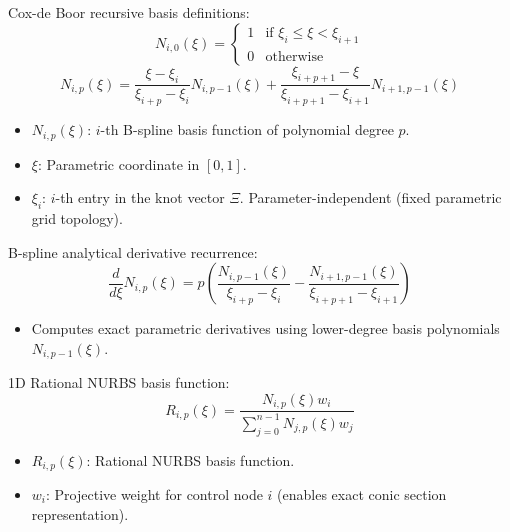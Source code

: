 \documentclass[12pt,a4paper,oneside]{report}
\begin{document}
Cox-de Boor recursive basis definitions:
\begin{equation}
    N_{i,0}(\xi) = \begin{cases} 1 & \text{if } \xi_i \le \xi < \xi_{i+1} \\ 0 & \text{otherwise} \end{cases}
\end{equation}
\begin{equation}
    N_{i,p}(\xi) = \frac{\xi - \xi_i}{\xi_{i+p} - \xi_i} N_{i,p-1}(\xi) + \frac{\xi_{i+p+1} - \xi}{\xi_{i+p+1} - \xi_{i+1}} N_{i+1,p-1}(\xi)
\end{equation}
\begin{tcolorbox}[colback=gray!5!white,colframe=gray!60!black,title={Term Definitions \& Parameter Dependencies}]
\begin{itemize}
    \item $N_{i,p}(\xi)$: $i$-th B-spline basis function of polynomial degree $p$.
    \item $\xi$: Parametric coordinate in $[0, 1]$.
    \item $\xi_i$: $i$-th entry in the knot vector $\Xi$. Parameter-independent (fixed parametric grid topology).
\end{itemize}
\end{tcolorbox}

B-spline analytical derivative recurrence:
\begin{equation}
    \frac{d}{d\xi} N_{i,p}(\xi) = p \left( \frac{N_{i,p-1}(\xi)}{\xi_{i+p} - \xi_i} - \frac{N_{i+1,p-1}(\xi)}{\xi_{i+p+1} - \xi_{i+1}} \right)
\end{equation}
\begin{tcolorbox}[colback=gray!5!white,colframe=gray!60!black,title={Term Definitions \& Parameter Dependencies}]
\begin{itemize}
    \item Computes exact parametric derivatives using lower-degree basis polynomials $N_{i,p-1}(\xi)$.
\end{itemize}
\end{tcolorbox}

1D Rational NURBS basis function:
\begin{equation}
    R_{i,p}(\xi) = \frac{N_{i,p}(\xi) w_i}{\sum_{j=0}^{n-1} N_{j,p}(\xi) w_j}
\end{equation}
\begin{tcolorbox}[colback=gray!5!white,colframe=gray!60!black,title={Term Definitions \& Parameter Dependencies}]
\begin{itemize}
    \item $R_{i,p}(\xi)$: Rational NURBS basis function.
    \item $w_i$: Projective weight for control node $i$ (enables exact conic section representation).
\end{itemize}
\end{tcolorbox}
\end{document}
